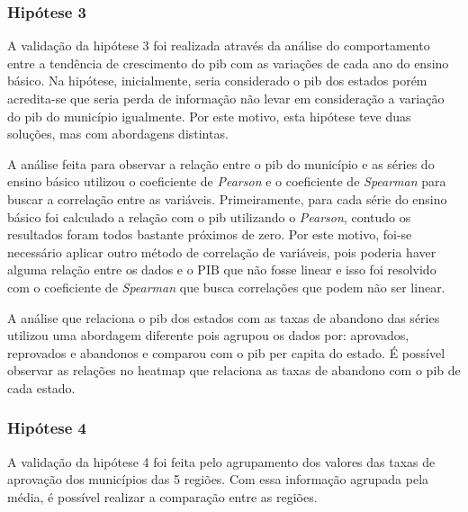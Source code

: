 \documentclass[review]{elsarticle}
\begin{document}
\subsubsection{Hipótese 3}
A validação da hipótese 3 foi realizada através da análise do comportamento entre a tendência de crescimento do pib com as variações de cada ano do ensino básico. Na hipótese, inicialmente, seria considerado o pib dos estados porém acredita-se que seria perda de informação não levar em consideração a variação do pib do município igualmente. Por este motivo, esta hipótese teve duas soluções, mas com abordagens distintas.\par
A análise feita para observar a relação entre o pib do município e as séries do ensino básico utilizou o coeficiente de \emph{Pearson} e o coeficiente de \emph{Spearman} para buscar a correlação entre as variáveis. Primeiramente, para cada série do ensino básico foi calculado a relação com o pib utilizando o \emph{Pearson}, contudo os resultados foram todos bastante próximos de zero. Por este motivo, foi-se necessário aplicar outro método de correlação de variáveis, pois poderia haver alguma relação entre os dados e o PIB que não fosse linear e isso foi resolvido com o coeficiente de \emph{Spearman} que busca correlações que podem não ser linear.\par
A análise que relaciona o pib dos estados com as taxas de abandono das séries utilizou uma abordagem diferente pois agrupou os dados por: aprovados, reprovados e abandonos e comparou com o pib per capita do estado. É possível observar as relações no heatmap que relaciona as taxas de abandono com o pib de cada estado.\par

\subsubsection{Hipótese 4}
A validação da hipótese 4 foi feita pelo agrupamento dos valores das taxas de aprovação dos municípios das 5 regiões. Com essa informação agrupada pela média, é possível realizar a comparação entre as regiões.\par
\end{document}
